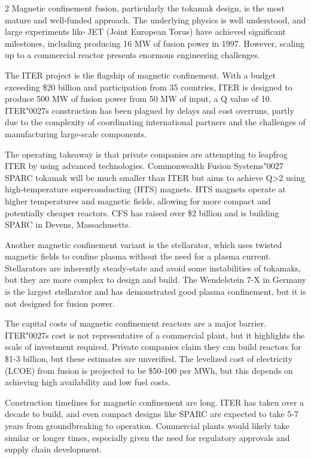 \documentclass[10pt,a4paper]{article}
\newcommand{\BOApos}{{\BOQuoteFont\char"0027}}
\begin{document}
\begin{multicols}{2}
{\small Magnetic confinement fusion, particularly the tokamak design, is the most mature and well-funded approach. The underlying physics is well understood, and large experiments like JET (Joint European Torus) have achieved significant milestones, including producing 16 MW of fusion power in 1997. However, scaling up to a commercial reactor presents enormous engineering challenges.}\par
{\small The ITER project is the flagship of magnetic confinement. With a budget exceeding \$20 billion and participation from 35 countries, ITER is designed to produce 500 MW of fusion power from 50 MW of input, a Q value of 10. ITER\BOApos{}s construction has been plagued by delays and cost overruns, partly due to the complexity of coordinating international partners and the challenges of manufacturing large-scale components.}\par
{\small The operating takeaway is that private companies are attempting to leapfrog ITER by using advanced technologies. Commonwealth Fusion Systems\BOApos{} SPARC tokamak will be much smaller than ITER but aims to achieve Q>2 using high-temperature superconducting (HTS) magnets. HTS magnets operate at higher temperatures and magnetic fields, allowing for more compact and potentially cheaper reactors. CFS has raised over \$2 billion and is building SPARC in Devens, Massachusetts.}\par
{\small Another magnetic confinement variant is the stellarator, which uses twisted magnetic fields to confine plasma without the need for a plasma current. Stellarators are inherently steady-state and avoid some instabilities of tokamaks, but they are more complex to design and build. The Wendelstein 7-X in Germany is the largest stellarator and has demonstrated good plasma confinement, but it is not designed for fusion power.}\par
{\small The capital costs of magnetic confinement reactors are a major barrier. ITER\BOApos{}s cost is not representative of a commercial plant, but it highlights the scale of investment required. Private companies claim they can build reactors for \$1-3 billion, but these estimates are unverified. The levelized cost of electricity (LCOE) from fusion is projected to be \$50-100 per MWh, but this depends on achieving high availability and low fuel costs.}\par
{\small Construction timelines for magnetic confinement are long. ITER has taken over a decade to build, and even compact designs like SPARC are expected to take 5-7 years from groundbreaking to operation. Commercial plants would likely take similar or longer times, especially given the need for regulatory approvals and supply chain development.}\par

\end{multicols}
\end{document}
